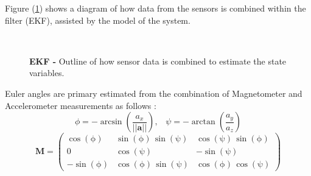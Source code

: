 \documentclass[conference]{IEEEtran}
\newcommand{\refp}[1]{(\ref{#1})}
\begin{document}
Figure \refp{fig:diagrama_kalman} shows a diagram of how data from the sensors is combined within the filter (EKF), assisted by the model of the system.

\begin{figure}
  \centering
   \\
  \caption{\textbf{EKF - } Outline of how sensor data is combined to estimate the state variables.}
  \label{fig:diagrama_kalman}
\end{figure}

Euler angles are primary estimated from the combination of Magnetometer and Accelerometer measurements as follows \cite{bib:kalman}:
  \[
  \phi = -\arcsin\left(\frac{a_x}{\vert\vert\mathbf{a}\vert\vert}\right), \;\;\;
  \psi =- \arctan \left(\frac{a_y}{a_z}\right)
  \]  
  \[
  \mathbf{M} = 
\left(\begin{array}{ccc} \cos\!\left(\mathrm{\phi}\right) & \sin\!\left(\mathrm{\phi}\right)\, \sin\!\left(\mathrm{\psi}\right) & \cos\!\left(\mathrm{\psi}\right)\, \sin\!\left(\mathrm{\phi}\right)\\ 0 & \cos\!\left(\mathrm{\psi}\right) & - \sin\!\left(\mathrm{\psi}\right)\\ - \sin\!\left(\mathrm{\phi}\right) & \cos\!\left(\mathrm{\phi}\right)\, \sin\!\left(\mathrm{\psi}\right) & \cos\!\left(\mathrm{\phi}\right)\, \cos\!\left(\mathrm{\psi}\right) \end{array}\right)
  \]
\end{document}
